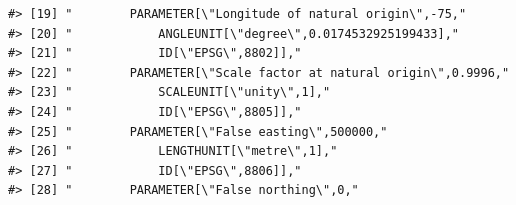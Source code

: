\documentclass[
]{book}
\begin{document}
\begin{verbatim}
#> [19] "        PARAMETER[\"Longitude of natural origin\",-75,"                                                                                                                                                                                                                         
#> [20] "            ANGLEUNIT[\"degree\",0.0174532925199433],"                                                                                                                                                                                                                          
#> [21] "            ID[\"EPSG\",8802]],"                                                                                                                                                                                                                                                
#> [22] "        PARAMETER[\"Scale factor at natural origin\",0.9996,"                                                                                                                                                                                                                   
#> [23] "            SCALEUNIT[\"unity\",1],"                                                                                                                                                                                                                                            
#> [24] "            ID[\"EPSG\",8805]],"                                                                                                                                                                                                                                                
#> [25] "        PARAMETER[\"False easting\",500000,"                                                                                                                                                                                                                                    
#> [26] "            LENGTHUNIT[\"metre\",1],"                                                                                                                                                                                                                                           
#> [27] "            ID[\"EPSG\",8806]],"                                                                                                                                                                                                                                                
#> [28] "        PARAMETER[\"False northing\",0,"                                                                                                                                                                                                                                        

\end{verbatim}
\end{document}
